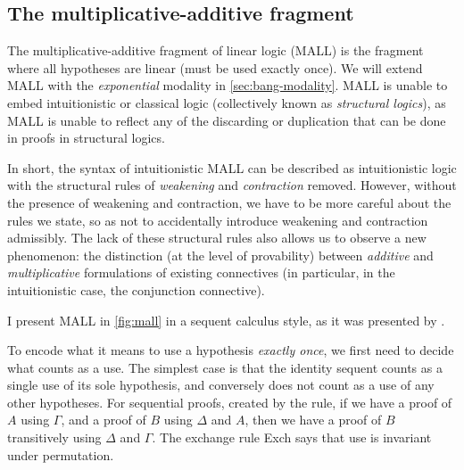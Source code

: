 %
%
%
%

\subsection{The multiplicative-additive fragment}

The multiplicative-additive fragment of linear logic (MALL) is the fragment
where all hypotheses are linear (must be used exactly once).
We will extend MALL with the \emph{exponential} modality in
\cref{sec:bang-modality}.
MALL is unable to embed intuitionistic or classical logic (collectively
known as \emph{structural logics}), as MALL is unable to reflect any of the
discarding or duplication that can be done in proofs in structural logics.

In short, the syntax of intuitionistic MALL can be described as intuitionistic
logic with the structural rules of \emph{weakening} and \emph{contraction}
removed.
However, without the presence of weakening and contraction, we have to be more
careful about the rules we state, so as not to accidentally introduce weakening
and contraction admissibly.
The lack of these structural rules also allows us to observe a new phenomenon:
the distinction (at the level of provability) between \emph{additive} and
\emph{multiplicative} formulations of existing connectives (in particular, in
the intuitionistic case, the conjunction connective).

I present MALL in \cref{fig:mall} in a sequent calculus style, as it was
presented by \citet{girard87linear}.

To encode what it means to use a hypothesis \emph{exactly once}, we first need
to decide what counts as a use.
The simplest case is that the identity sequent counts as a single use of its
sole hypothesis, and conversely does not count as a use of any other hypotheses.
For sequential proofs, created by the  rule, if we have a proof of
$A$ using $\Gamma$, and a proof of $B$ using $\Delta$ and $A$, then we have a
proof of $B$ transitively using $\Delta$ and $\Gamma$.
The exchange rule Exch says that use is invariant under permutation.

